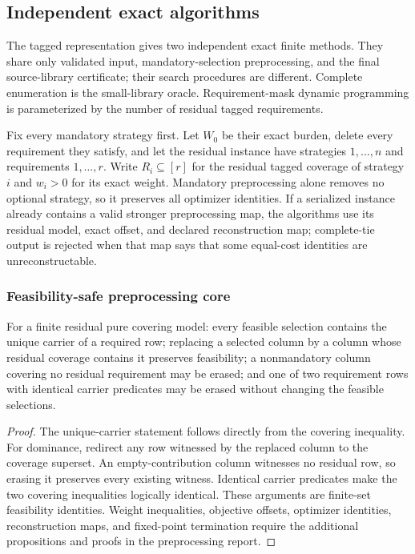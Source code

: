 \subsection{Independent exact algorithms}
\label{subsec:aor-exact-algorithms}

The tagged representation gives two independent exact finite methods.  They
share only validated input, mandatory-selection preprocessing, and the final
source-library certificate; their search procedures are different.  Complete
enumeration is the small-library oracle.  Requirement-mask dynamic programming
is parameterized by the number of residual tagged requirements.

Fix every mandatory strategy first.  Let $W_0$ be their exact burden, delete
every requirement they satisfy, and let the residual instance have strategies
$1,\ldots,n$ and requirements $1,\ldots,r$.  Write $R_i\subseteq[r]$ for
the residual tagged coverage of strategy $i$ and $w_i>0$ for its exact weight.
Mandatory preprocessing alone removes no optional strategy, so it preserves
all optimizer identities.  If a serialized instance already contains a valid
stronger preprocessing map, the algorithms use its residual model, exact
offset, and declared reconstruction map; complete-tie output is rejected when
that map says that some equal-cost identities are unreconstructable.

\subsubsection{Feasibility-safe preprocessing core}

\begin{proposition}
\label{prop:aor-preprocessing-feasibility-core}
For a finite residual pure covering model: every feasible selection contains
the unique carrier of a required row; replacing a selected column by a column
whose residual coverage contains it preserves feasibility; a nonmandatory
column covering no residual requirement may be erased; and one of two
requirement rows with identical carrier predicates may be erased without
changing the feasible selections.
\end{proposition}

\begin{proof}
The unique-carrier statement follows directly from the covering inequality.
For dominance, redirect any row witnessed by the replaced column to the
coverage superset.  An empty-contribution column witnesses no residual row,
so erasing it preserves every existing witness.  Identical carrier predicates
make the two covering inequalities logically identical.  These arguments are
finite-set feasibility identities.  Weight inequalities, objective offsets,
optimizer identities, reconstruction maps, and fixed-point termination require
the additional propositions and proofs in the preprocessing report.
\end{proof}

